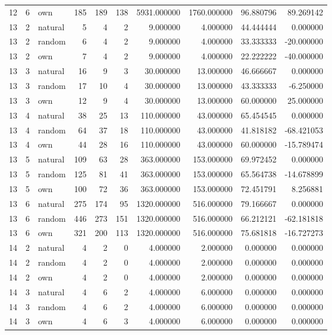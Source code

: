 \begin{table}[htbp]
\begin{tabular}{rrlrrrrrrr}
12 & 6 & own & 185 & 189 & 138 & 5931.000000 & 1760.000000 & 96.880796 & 89.269142 \\
13 & 2 & natural & 5 & 4 & 2 & 9.000000 & 4.000000 & 44.444444 & 0.000000 \\
13 & 2 & random & 6 & 4 & 2 & 9.000000 & 4.000000 & 33.333333 & -20.000000 \\
13 & 2 & own & 7 & 4 & 2 & 9.000000 & 4.000000 & 22.222222 & -40.000000 \\
13 & 3 & natural & 16 & 9 & 3 & 30.000000 & 13.000000 & 46.666667 & 0.000000 \\
13 & 3 & random & 17 & 10 & 4 & 30.000000 & 13.000000 & 43.333333 & -6.250000 \\
13 & 3 & own & 12 & 9 & 4 & 30.000000 & 13.000000 & 60.000000 & 25.000000 \\
13 & 4 & natural & 38 & 25 & 13 & 110.000000 & 43.000000 & 65.454545 & 0.000000 \\
13 & 4 & random & 64 & 37 & 18 & 110.000000 & 43.000000 & 41.818182 & -68.421053 \\
13 & 4 & own & 44 & 28 & 16 & 110.000000 & 43.000000 & 60.000000 & -15.789474 \\
13 & 5 & natural & 109 & 63 & 28 & 363.000000 & 153.000000 & 69.972452 & 0.000000 \\
13 & 5 & random & 125 & 81 & 41 & 363.000000 & 153.000000 & 65.564738 & -14.678899 \\
13 & 5 & own & 100 & 72 & 36 & 363.000000 & 153.000000 & 72.451791 & 8.256881 \\
13 & 6 & natural & 275 & 174 & 95 & 1320.000000 & 516.000000 & 79.166667 & 0.000000 \\
13 & 6 & random & 446 & 273 & 151 & 1320.000000 & 516.000000 & 66.212121 & -62.181818 \\
13 & 6 & own & 321 & 200 & 113 & 1320.000000 & 516.000000 & 75.681818 & -16.727273 \\
14 & 2 & natural & 4 & 2 & 0 & 4.000000 & 2.000000 & 0.000000 & 0.000000 \\
14 & 2 & random & 4 & 2 & 0 & 4.000000 & 2.000000 & 0.000000 & 0.000000 \\
14 & 2 & own & 4 & 2 & 0 & 4.000000 & 2.000000 & 0.000000 & 0.000000 \\
14 & 3 & natural & 4 & 6 & 2 & 4.000000 & 6.000000 & 0.000000 & 0.000000 \\
14 & 3 & random & 4 & 6 & 2 & 4.000000 & 6.000000 & 0.000000 & 0.000000 \\
14 & 3 & own & 4 & 6 & 3 & 4.000000 & 6.000000 & 0.000000 & 0.000000 \\

\end{tabular}
\end{table}
